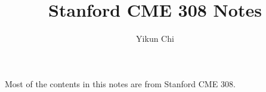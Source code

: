 \documentclass{book}
\title{Stanford CME 308 Notes}
\author{Yikun Chi}
\begin{document}
\maketitle
Most of the contents in this notes are from Stanford CME 308. 

\tableofcontents 










\end{document}
